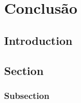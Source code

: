 \chapter{Conclusão}

\section{Introduction}

\lipsum[1-4]

\section{Section}

\lipsum[2-4]

\subsection{Subsection}

\lipsum[2-4]
